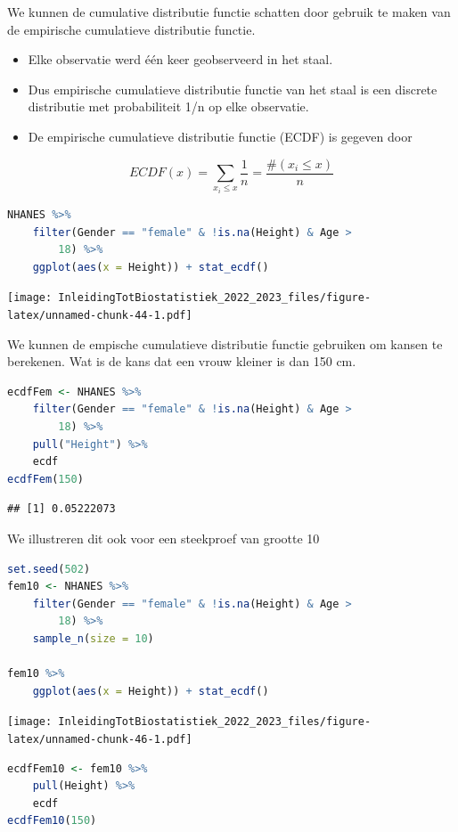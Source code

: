 \documentclass[
  12pt,dutch,coursenotes]{book}
\providecommand{\tightlist}{%
  \setlength{\itemsep}{0pt}\setlength{\parskip}{0pt}}
\begin{document}
We kunnen de cumulative distributie functie schatten door gebruik te maken van de empirische cumulatieve distributie functie.

\begin{itemize}
\tightlist
\item
  Elke observatie werd één keer geobserveerd in het staal.
\item
  Dus empirische cumulatieve distributie functie van het staal is een discrete distributie met probabiliteit 1/n op elke observatie.
\item
  De empirische cumulatieve distributie functie (ECDF) is gegeven door
\end{itemize}

\[ECDF(x) = \sum\limits_{x_i \leq x} \frac{1}{n} = \frac{\# (x_i \leq x)}{n}\]

\begin{lstlisting}[language=R]
NHANES %>%
    filter(Gender == "female" & !is.na(Height) & Age >
        18) %>%
    ggplot(aes(x = Height)) + stat_ecdf()
\end{lstlisting}

\texttt{[image: InleidingTotBiostatistiek\_2022\_2023\_files/figure-latex/unnamed-chunk-44-1.pdf]}

We kunnen de empische cumulatieve distributie functie gebruiken om kansen te berekenen.
Wat is de kans dat een vrouw kleiner is dan 150 cm.

\begin{lstlisting}[language=R]
ecdfFem <- NHANES %>%
    filter(Gender == "female" & !is.na(Height) & Age >
        18) %>%
    pull("Height") %>%
    ecdf
ecdfFem(150)
\end{lstlisting}

\begin{lstlisting}
## [1] 0.05222073
\end{lstlisting}

We illustreren dit ook voor een steekproef van grootte 10

\begin{lstlisting}[language=R]
set.seed(502)
fem10 <- NHANES %>%
    filter(Gender == "female" & !is.na(Height) & Age >
        18) %>%
    sample_n(size = 10)

fem10 %>%
    ggplot(aes(x = Height)) + stat_ecdf()
\end{lstlisting}

\texttt{[image: InleidingTotBiostatistiek\_2022\_2023\_files/figure-latex/unnamed-chunk-46-1.pdf]}

\begin{lstlisting}[language=R]
ecdfFem10 <- fem10 %>%
    pull(Height) %>%
    ecdf
ecdfFem10(150)
\end{lstlisting}
\end{document}
